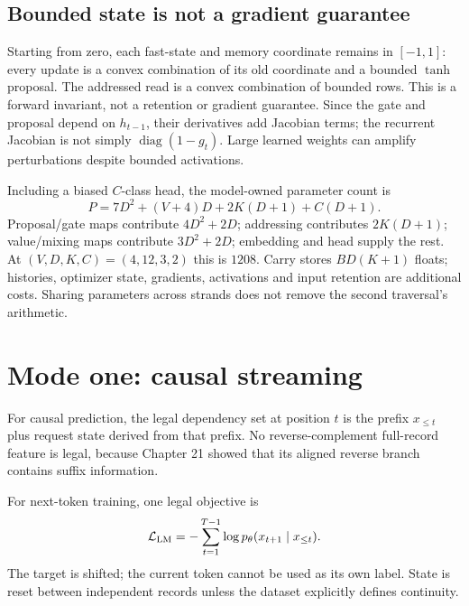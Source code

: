 \subsection{Bounded state is not a gradient guarantee}

Starting from zero, each fast-state and memory coordinate remains in $[-1,1]$:
every update is a convex combination of its old coordinate and a bounded
$\tanh$ proposal. The addressed read is a convex combination of bounded rows.
This is a forward invariant, not a retention or gradient guarantee. Since
the gate and proposal depend on $h_{t-1}$, their derivatives add Jacobian
terms; the recurrent Jacobian is not simply $\operatorname{diag}(1-g_t)$.
Large learned weights can amplify perturbations despite bounded activations.

Including a biased $C$-class head, the model-owned parameter count is
\begin{equation}
 P=7D^2+(V+4)D+2K(D+1)+C(D+1).
 \label{evod22:parameters}
\end{equation}
Proposal/gate maps contribute $4D^2+2D$; addressing contributes $2K(D+1)$;
value/mixing maps contribute $3D^2+2D$; embedding and head supply the rest.
At $(V,D,K,C)=(4,12,3,2)$ this is $1208$. Carry stores $BD(K+1)$ floats;
histories, optimizer state, gradients, activations and input retention are
additional costs. Sharing parameters across strands does not remove the
second traversal's arithmetic.

\section{Mode one: causal streaming}

For causal prediction, the legal dependency set at position $t$ is the prefix
$x_{\le t}$ plus request state derived from that prefix. No reverse-complement
full-record feature is legal, because Chapter 21 showed that its aligned reverse
branch contains suffix information.


For next-token training, one legal objective is
\[
\mathcal L_{\rm LM}
=-\sum_{t=1}^{T-1}\log p_\theta(x_{t+1}\mid x_{\le t}).
\]
The target is shifted; the current token cannot be used as its own label. State is
reset between independent records unless the dataset explicitly defines continuity.

